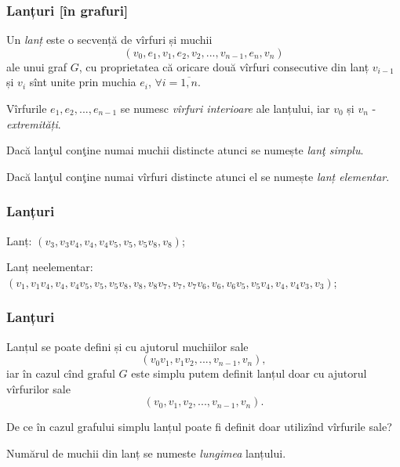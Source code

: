 \begin{frame}
  \frametitle{Lanțuri [în grafuri]}
 
Un \emph{lanț} este o secvență de vîrfuri și muchii
\[
 (v_0,e_1,v_1,e_2,v_2, ..., v_{n-1},e_n,v_n)
\]
ale unui graf $G$, cu proprietatea că oricare două vîrfuri consecutive din 
lanț $v_{i-1}$ și $v_i$ sînt unite prin muchia $e_i$, $\forall i=\overline{1,n}$.

Vîrfurile $e_1,e_2,..., e_{n-1}$ se numesc \emph{vîrfuri interioare} ale lanțului, iar $v_0$ și $v_n$ - \emph{extremități}.

Dacă lanţul conţine numai muchii distincte atunci se numește \emph{lanţ simplu}.

Dacă lanţul conţine numai vîrfuri distincte atunci el se numește \emph{lanț elementar}.

\end{frame}

\begin{frame}
  \frametitle{Lanțuri}

\begin{figure}
\centering%
\end{figure}

Lanț: $(v_3,v_3v_4,v_4,v_4v_5,v_5,v_5v_8,v_8)$;

Lanț neelementar: $(v_1,v_1v_4,v_4,v_4v_5,v_5,v_5v_8,v_8,v_8v_7,v_7,v_7v_6,v_6,v_6v_5,v_5v_4,v_4,v_4v_3,v_3)$;

\end{frame}

\begin{frame}
  \frametitle{Lanțuri}

Lanțul se poate defini și cu ajutorul muchiilor sale 
\[
  (v_0v_1, v_1v_2, ..., v_{n-1},v_n),
\]
iar în cazul cînd graful $G$ este simplu putem definit lanțul doar cu ajutorul 
vîrfurilor sale
\[
  (v_0,v_1,v_2, ..., v_{n-1},v_n).
\]

De ce în cazul grafului simplu lanțul poate fi definit doar utilizînd vîrfurile sale?

Numărul de muchii din lanț se numeste \emph{lungimea} lanțului.
\end{frame}


